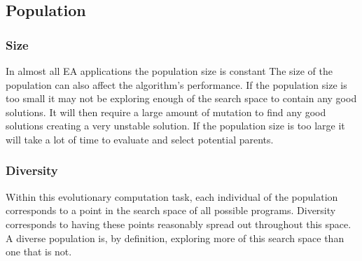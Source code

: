 \documentclass{article}
\begin{document}
\subsection{Population}
\subsubsection{Size}
In almost all EA applications the population size is constant\cite[p. 20]{textbook}
The size of the population can also affect the algorithm's performance. If the population size is too small it may not be exploring enough of the search space to contain any good solutions. It will then require a large amount of mutation to find any good solutions creating a very unstable solution. If the population size is too large it will take a lot of time to evaluate and select potential parents.



\subsubsection{Diversity}
Within this evolutionary computation task, each individual of the population corresponds to a point in the search space of all possible programs. %
Diversity corresponds to having these points reasonably spread out throughout this space. A diverse population is, by definition, exploring more of this search space than one that is not. %
\end{document}

